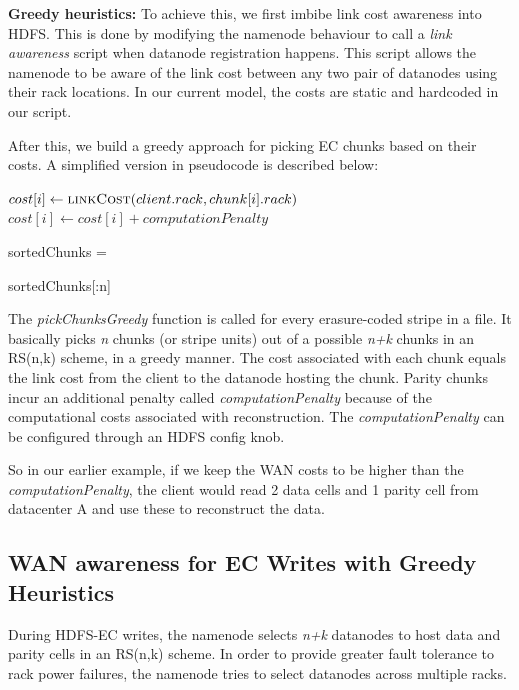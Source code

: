 \documentclass{sig-alternate-05-2015}
\begin{document}
\textbf{Greedy heuristics:} To achieve this, we first imbibe link cost awareness into HDFS. This is done by modifying the namenode behaviour to call a \emph{link awareness} script when datanode registration happens. This script allows the namenode to be aware of the link cost between any two pair of datanodes using their rack locations. In our current model, the costs are static and hardcoded in our script. 

After this, we build a greedy approach for picking EC chunks based on their costs. A simplified version in pseudocode is described below:
\vspace{0.5em}
\begin{algorithmic}
\State $cost[i]\gets \Call{linkCost}{client.rack, chunk[i].rack}$
    \State $cost[i]\gets cost[i] + computationPenalty$
\EndIf
\EndFor

sortedChunks = 

\Return sortedChunks[:n]
\EndFunction
\end{algorithmic}
\vspace{0.5em}

The \emph{pickChunksGreedy} function is called for every erasure-coded stripe in a file. It basically picks \emph{n} chunks (or stripe units) out of a possible \emph{n+k} chunks in an RS(n,k) scheme, in a greedy manner. The cost associated with each chunk equals the link cost from the client to the datanode hosting the chunk. Parity chunks incur an additional penalty called \emph{computationPenalty} because of the computational costs associated with reconstruction. The \emph{computationPenalty} can be configured through an HDFS config knob.

So in our earlier example, if we keep the WAN costs to be higher than the \emph{computationPenalty}, the client would read 2 data cells and 1 parity cell from datacenter A and use these to reconstruct the data.

\subsection{WAN awareness for EC Writes with Greedy Heuristics}
During HDFS-EC writes, the namenode selects \emph{n+k} datanodes to host data and parity cells in an RS(n,k) scheme. In order to provide greater fault tolerance to rack power failures, the namenode tries to select datanodes across multiple racks. 
\end{document}
